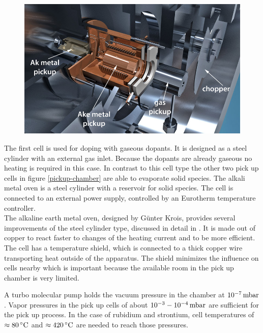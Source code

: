\documentclass[parskip,12pt,headsepline,a4paper] {scrbook}
\begin{document}
\begin{figure}[ht]
\centerline{
\includegraphics[width=13cm]{./experimental_setup/pickup-chamber.jpg}}
\end{figure}

The first cell is used for doping with gaseous dopants. It is designed as a steel cylinder with an external gas inlet. Because the dopants are already gaseous no heating is required in this case.
In contrast to this cell type the other two pick up cells in figure \ref{pickup-chamber} are able to evaporate solid species. The alkali metal oven is a steel cylinder with a reservoir for solid species. The cell is connected to an external power supply, controlled by an Eurotherm temperature controller. \\
The alkaline earth metal oven, designed by G\"unter Krois, provides several improvements of the steel cylinder type, discussed in detail in \cite{krois}. It is made out of copper to react faster to changes of the heating current and to be more efficient. The cell has a temperature shield, which is connected to a thick copper wire transporting heat outside of the apparatus. The shield minimizes the influence on cells nearby which is important because the available room in the pick up chamber is very limited.

A turbo molecular pump holds the vacuum pressure in the chamber at $\unit[10^{-7}]{mbar}$. Vapor pressures in the pick up cells of about $\unit[10^{-3}-10^{-4}]{mbar}$ are sufficient for the pick up process. In the case of rubidium and strontium, cell temperatures of $\unit[\approx 80]{^\circ C}$ and $\unit[\approx 420]{^\circ C}$ are needed to reach those pressures.
\end{document}
